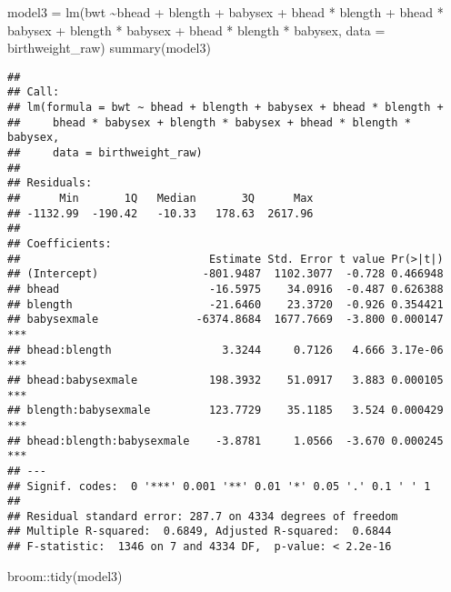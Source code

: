 \documentclass[
]{article}
\newenvironment{Shaded}{\begin{snugshade}}{\end{snugshade}}
\newcommand{\AttributeTok}[1]{\textcolor[rgb]{0.77,0.63,0.00}{#1}}
\newcommand{\FunctionTok}[1]{\textcolor[rgb]{0.00,0.00,0.00}{#1}}
\newcommand{\NormalTok}[1]{#1}
\newcommand{\OtherTok}[1]{\textcolor[rgb]{0.56,0.35,0.01}{#1}}
\newcommand{\SpecialCharTok}[1]{\textcolor[rgb]{0.00,0.00,0.00}{#1}}
\begin{document}
\begin{Shaded}
\begin{Highlighting}[]
\NormalTok{model3 }\OtherTok{=} \FunctionTok{lm}\NormalTok{(bwt }\SpecialCharTok{\textasciitilde{}}\NormalTok{bhead }\SpecialCharTok{+}\NormalTok{ blength }\SpecialCharTok{+}\NormalTok{ babysex }\SpecialCharTok{+} 
\NormalTok{              bhead }\SpecialCharTok{*}\NormalTok{ blength }\SpecialCharTok{+}\NormalTok{ bhead }\SpecialCharTok{*}\NormalTok{ babysex }\SpecialCharTok{+}\NormalTok{ blength }\SpecialCharTok{*}\NormalTok{ babysex }\SpecialCharTok{+}\NormalTok{ bhead }\SpecialCharTok{*}\NormalTok{ blength }\SpecialCharTok{*}\NormalTok{ babysex, }\AttributeTok{data =}\NormalTok{ birthweight\_raw)}
\FunctionTok{summary}\NormalTok{(model3)}
\end{Highlighting}
\end{Shaded}

\begin{verbatim}
## 
## Call:
## lm(formula = bwt ~ bhead + blength + babysex + bhead * blength + 
##     bhead * babysex + blength * babysex + bhead * blength * babysex, 
##     data = birthweight_raw)
## 
## Residuals:
##      Min       1Q   Median       3Q      Max 
## -1132.99  -190.42   -10.33   178.63  2617.96 
## 
## Coefficients:
##                             Estimate Std. Error t value Pr(>|t|)    
## (Intercept)                -801.9487  1102.3077  -0.728 0.466948    
## bhead                       -16.5975    34.0916  -0.487 0.626388    
## blength                     -21.6460    23.3720  -0.926 0.354421    
## babysexmale               -6374.8684  1677.7669  -3.800 0.000147 ***
## bhead:blength                 3.3244     0.7126   4.666 3.17e-06 ***
## bhead:babysexmale           198.3932    51.0917   3.883 0.000105 ***
## blength:babysexmale         123.7729    35.1185   3.524 0.000429 ***
## bhead:blength:babysexmale    -3.8781     1.0566  -3.670 0.000245 ***
## ---
## Signif. codes:  0 '***' 0.001 '**' 0.01 '*' 0.05 '.' 0.1 ' ' 1
## 
## Residual standard error: 287.7 on 4334 degrees of freedom
## Multiple R-squared:  0.6849, Adjusted R-squared:  0.6844 
## F-statistic:  1346 on 7 and 4334 DF,  p-value: < 2.2e-16
\end{verbatim}

\begin{Shaded}
\begin{Highlighting}[]
\NormalTok{broom}\SpecialCharTok{::}\FunctionTok{tidy}\NormalTok{(model3)}
\end{Highlighting}
\end{Shaded}
\end{document}
